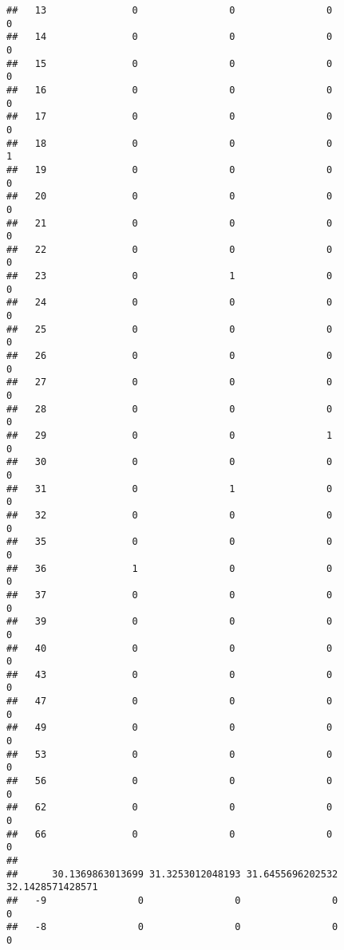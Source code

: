 \documentclass[]{article}
\begin{document}
\begin{verbatim}
##   13               0                0                0                0
##   14               0                0                0                0
##   15               0                0                0                0
##   16               0                0                0                0
##   17               0                0                0                0
##   18               0                0                0                1
##   19               0                0                0                0
##   20               0                0                0                0
##   21               0                0                0                0
##   22               0                0                0                0
##   23               0                1                0                0
##   24               0                0                0                0
##   25               0                0                0                0
##   26               0                0                0                0
##   27               0                0                0                0
##   28               0                0                0                0
##   29               0                0                1                0
##   30               0                0                0                0
##   31               0                1                0                0
##   32               0                0                0                0
##   35               0                0                0                0
##   36               1                0                0                0
##   37               0                0                0                0
##   39               0                0                0                0
##   40               0                0                0                0
##   43               0                0                0                0
##   47               0                0                0                0
##   49               0                0                0                0
##   53               0                0                0                0
##   56               0                0                0                0
##   62               0                0                0                0
##   66               0                0                0                0
##     
##      30.1369863013699 31.3253012048193 31.6455696202532 32.1428571428571
##   -9                0                0                0                0
##   -8                0                0                0                0

\end{verbatim}
\end{document}
